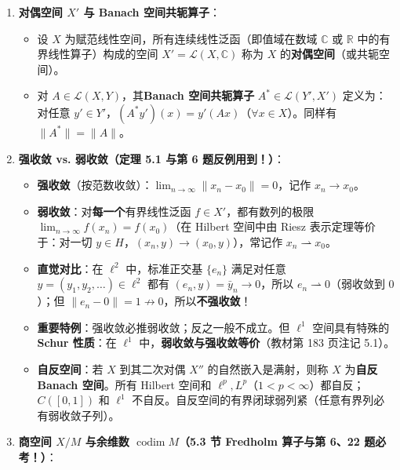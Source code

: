 \documentclass[11pt,a4paper]{article}
\providecommand{\tightlist}{\setlength{\itemsep}{2pt}\setlength{\parskip}{0pt}}
\begin{document}
\begin{enumerate}
\def\labelenumi{\arabic{enumi}.}
\tightlist
\item
  \textbf{对偶空间 \(X'\) 与 Banach 空间共轭算子}：

  \begin{itemize}
  \tightlist
  \item
    设 \(X\) 为赋范线性空间，所有连续线性泛函（即值域在数域 \(\mathbb{C}\) 或 \(\mathbb{R}\) 中的有界线性算子）构成的空间 \(X' = \mathcal{L}(X, \mathbb{C})\) 称为 \(X\) 的\textbf{对偶空间}（或共轭空间）。
  \item
    对 \(A \in \mathcal{L}(X, Y)\)，其\textbf{Banach 空间共轭算子} \(A^* \in \mathcal{L}(Y', X')\) 定义为：对任意 \(y' \in Y'\)，\((A^* y')(x) = y'(Ax)\)（\(\forall x \in X\)）。同样有 \(\|A^*\| = \|A\|\)。
  \end{itemize}
\item
  \textbf{强收敛 vs. 弱收敛（定理 5.1 与第 6 题反例用到！）}：

  \begin{itemize}
  \tightlist
  \item
    \textbf{强收敛}（按范数收敛）：\(\lim_{n\to\infty} \|x_n - x_0\| = 0\)，记作 \(x_n \to x_0\)。
  \item
    \textbf{弱收敛}：对\textbf{每一个}有界线性泛函 \(f \in X'\)，都有数列的极限 \(\lim_{n\to\infty} f(x_n) = f(x_0)\)（在 Hilbert 空间中由 Riesz 表示定理等价于：对一切 \(y \in H\)，\((x_n, y) \to (x_0, y)\)），常记作 \(x_n \rightharpoonup x_0\)。
  \item
    \textbf{直觉对比}：在 \(\ell^2\) 中，标准正交基 \(\{e_n\}\) 满足对任意 \(y = (y_1, y_2, \dots) \in \ell^2\) 都有 \((e_n, y) = \bar{y}_n \to 0\)，所以 \(e_n \rightharpoonup 0\)（弱收敛到 \(0\)）；但 \(\|e_n - 0\| = 1 \not\to 0\)，所以\textbf{不强收敛}！
  \item
    \textbf{重要特例}：强收敛必推弱收敛；反之一般不成立。但 \(\ell^1\) 空间具有特殊的 \textbf{Schur 性质}：在 \(\ell^1\) 中，\textbf{弱收敛与强收敛等价}（教材第 183 页注记 5.1）。
  \item
    \textbf{自反空间}：若 \(X\) 到其二次对偶 \(X''\) 的自然嵌入是满射，则称 \(X\) 为\textbf{自反 Banach 空间}。所有 Hilbert 空间和 \(\ell^p, L^p\)（\(1 < p < \infty\)）都自反；\(C([0,1])\) 和 \(\ell^1\) 不自反。自反空间的有界闭球弱列紧（任意有界列必有弱收敛子列）。
  \end{itemize}
\item
  \textbf{商空间 \(X / M\) 与余维数 \(\operatorname{codim} M\)（5.3 节 Fredholm 算子与第 6、22 题必考！）}：


\end{enumerate}
\end{document}
